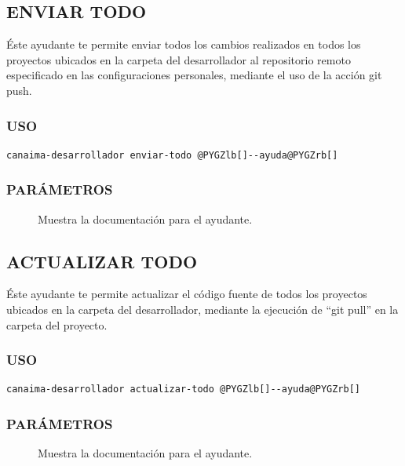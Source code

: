 \documentclass[letterpaper,12pt,spanish]{manual}
\begin{document}
\subsection{\textbf{ENVIAR TODO}}

Éste ayudante te permite enviar todos los cambios realizados en todos los proyectos ubicados en la carpeta del desarrollador al repositorio remoto especificado en las configuraciones personales, mediante el uso de la acción git push.


\subsubsection{USO}

\begin{Verbatim}[commandchars=@\[\]]
canaima-desarrollador enviar-todo @PYGZlb[]--ayuda@PYGZrb[]
\end{Verbatim}


\subsubsection{PARÁMETROS}
\begin{description}
\item[{}] \leavevmode
Muestra la documentación para el ayudante.

\end{description}


\subsection{\textbf{ACTUALIZAR TODO}}

Éste ayudante te permite actualizar el código fuente de todos los proyectos ubicados en la carpeta del desarrollador, mediante la ejecución de ``git pull'' en la carpeta del proyecto.


\subsubsection{USO}

\begin{Verbatim}[commandchars=@\[\]]
canaima-desarrollador actualizar-todo @PYGZlb[]--ayuda@PYGZrb[]
\end{Verbatim}


\subsubsection{PARÁMETROS}
\begin{description}
\item[{}] \leavevmode
Muestra la documentación para el ayudante.

\end{description}
\end{document}
